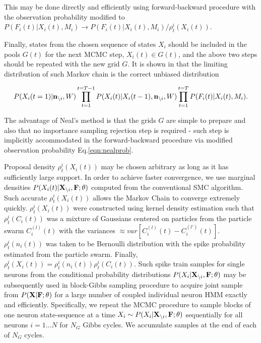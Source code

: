 This may be done directly and efficiently using forward-backward procedure with the observation probability modified to $P(F_i(t)|X_i(t), M_i)\rightarrow P(F_i(t)|X_i(t), M_i)/{\rho^i_t(X_i(t))}$.

Finally, states from the chosen sequence of states $X_i$ should be included in the pools $G(t)$ for the next MCMC step, $X_i(t)\in G(t)$, and the above two steps should be repeated with the new grid $G$. It is shown in \cite{NBR03} that the limiting distribution of such Markov chain is the correct unbiased distribution

\begin{equation}
P(X_i(t=1)|{\bf n}_{\backslash i}, W)\prod\limits_{t=1}^{t=T-1}P(X_i(t)|X_i(t-1), {\bf n}_{\backslash i}, W)\prod\limits_{t=1}^{t=T}P(F_i(t)|X_i(t), M_i).
\end{equation}

The advantage of Neal's method is that the grids $G$ are simple to prepare and also that no importance sampling rejection step is required - such step is implicitly accommodated in the forward-backward procedure via modified observation probability Eq.\eqref{eqn:nealprob}.

Proposal density $\rho^i_t(X_i(t))$ may be chosen arbitrary as long as it has sufficiently large support.  In order to achieve faster convergence, we use marginal densities $P(X_i(t)|{\bf X}_{\backslash i}, \bf F; \theta)$ computed from the conventional SMC algorithm. Such accurate $\rho^i_t(X_i(t))$ allows the Markov Chain to converge extremely quickly.  $\rho^i_t(X_i(t))$ were constructed using kernel density estimation such that $\rho^i_t(C_i(t))$ was a mixture of Gaussians centered on particles from the particle swarm $C_i^{(l)}(t)$ with the variances $\approx var\left[C_i^{(l)}(t)-C_i^{(l')}(t) \right]$. $\rho^i_t(n_i(t))$ was taken to be Bernoulli distribution with the spike probability estimated from the particle swarm. Finally, $\rho^i_t(X_i(t)) = \rho^i_t(n_i(t)) \rho^i_t(C_i(t))$.  Such spike train samples for single neurons from the conditional probability distributions $P(X_i|{\bf X}_{\backslash i}, \bf F; \theta)$ may be subsequently used in block-Gibbs sampling procedure to acquire joint sample from $P({\bf X}| {\bf F}; \theta)$ for a large number of coupled individual neuron HMM exactly and efficiently.  Specifically, we repeat the MCMC procedure to sample blocks of one neuron state-sequence at a time $X_i\sim P(X_{i}|{\bf X}_{\backslash i},{\bf F}; \theta)$ sequentially for all neurons $i=1\ldots N$ for $N_G$ Gibbs cycles.  We accumulate samples at the end of each of $N_G$ cycles.

